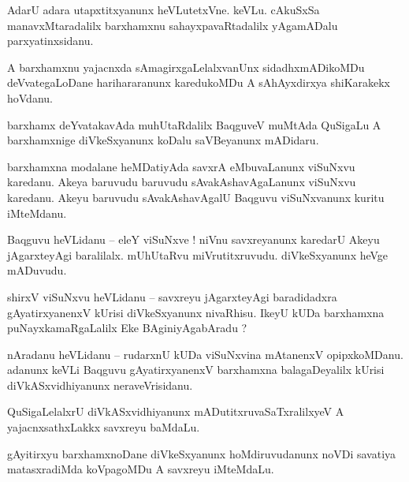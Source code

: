 \documentclass{article}
\begin{document}
\begin{mn}%
AdarU adara utapxtitxyanunx heVLutetxVne. keVLu. cAkuSxSa manavxMtaradalilx barxhamxnu 
sahayxpavaRtadalilx yAgamADalu parxyatinxsidanu.
\end{mn}

\begin{mn}%
A barxhamxnu yajacnxda sAmagirxgaLelalxvanUnx sidadhxmADikoMDu deVvategaLoDane harihararanunx 
karedukoMDu A sAhAyxdirxya shiKarakekx hoVdanu.
\end{mn}

\begin{mn}%
barxhamx deYvatakavAda muhUtaRdalilx BaqguveV muMtAda QuSigaLu A barxhamxnige diVkeSxyanunx koDalu 
saVBeyanunx mADidaru.
\end{mn}

\begin{mn}%
barxhamxna modalane heMDatiyAda savxrA eMbuvaLanunx viSuNxvu karedanu. Akeya baruvudu baruvudu 
sAvakAshavAgaLanunx viSuNxvu karedanu. Akeyu baruvudu sAvakAshavAgalU Baqguvu viSuNxvanunx kuritu 
iMteMdanu.
\end{mn}

\begin{mn}%
Baqguvu heVLidanu -- eleY viSuNxve ! niVnu savxreyanunx karedarU Akeyu jAgarxteyAgi baralilalx. 
mUhUtaRvu miVrutitxruvudu. diVkeSxyanunx heVge mADuvudu.
\end{mn}

\begin{mn}%
shirxV viSuNxvu heVLidanu -- savxreyu jAgarxteyAgi baradidadxra gAyatirxyanenxV kUrisi 
diVkeSxyanunx nivaRhisu. IkeyU kUDa barxhamxna puNayxkamaRgaLalilx Eke BAginiyAgabAradu ?
\end{mn}

\begin{mn}%
nAradanu heVLidanu -- rudarxnU kUDa viSuNxvina mAtanenxV opipxkoMDanu. adanunx keVLi Baqguvu 
gAyatirxyanenxV barxhamxna balagaDeyalilx kUrisi diVkASxvidhiyanunx neraveVrisidanu.
\end{mn}

\begin{mn}%
QuSigaLelalxrU diVkASxvidhiyanunx mADutitxruvaSaTxralilxyeV A yajacnxsathxLakkx savxreyu baMdaLu.
\end{mn}

\begin{mn}%
gAyitirxyu barxhamxnoDane diVkeSxyanunx hoMdiruvudanunx noVDi savatiya matasxradiMda koVpagoMDu A 
savxreyu iMteMdaLu.
\end{mn}
\end{document}
